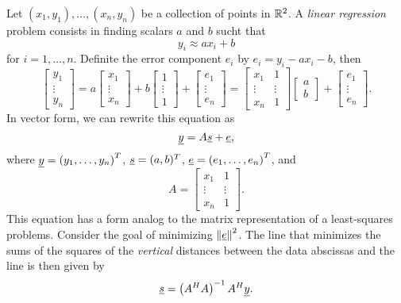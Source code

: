 Let $(x_1, y_1), \ldots, (x_n, y_n)$ be a collection of points in $\mathbb{R}^2$.
A \emph{linear regression} problem consists in finding scalars $a$ and $b$ sucht that
\begin{equation*}
y_i \approx a x_i + b
\end{equation*}
for $i = 1, \ldots, n$.
Definite the error component $e_i$ by $e_i = y_i - a x_i - b$, then
\begin{equation*}
\left[ \begin{array}{c} y_1 \\ \vdots \\ y_n \end{array} \right]
= a \left[ \begin{array}{c} x_1 \\ \vdots \\ x_n \end{array} \right]
+ b \left[ \begin{array}{c} 1 \\ \vdots \\ 1 \end{array} \right]
+ \left[ \begin{array}{c} e_1 \\ \vdots \\ e_n \end{array} \right]
= \left[ \begin{array}{cc} x_1 & 1 \\
\vdots & \vdots \\ x_n & 1 \end{array} \right]
\left[ \begin{array}{c} a \\ b \end{array} \right]
+ \left[ \begin{array}{c} e_1 \\ \vdots \\ e_n \end{array} \right] .
\end{equation*}
In vector form, we can rewrite this equation as
\begin{equation*}
\underline{y} = A \underline{s} + \underline{e},
\end{equation*}
where $\underline{y} = \left( y_1, \ldots, y_n \right)^T$, $\underline{s} = (a, b)^T$, $\underline{e} = \left( e_1, \ldots, e_n \right)^T$, and
\begin{equation*}
A = \left[ \begin{array}{cc} x_1 & 1 \\
\vdots & \vdots \\ x_n & 1 \end{array} \right] .
\end{equation*}
This equation has a form analog to the matrix representation of a least-squares problems.
Consider the goal of minimizing $\left\| \underline{e} \right\|^2$.
The line that minimizes the sums of the squares of the \emph{vertical} distances between the data abscissas and the line is then given by
\begin{equation*}
\underline{s} = \left( A^H A \right)^{-1} A^H \underline{y} .
\end{equation*}


